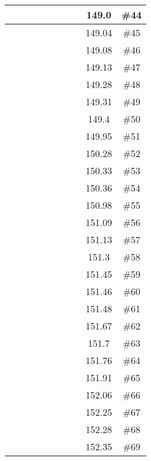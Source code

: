 \begin{center}
\begin{longtable}{|c|c|c|c|c|c|c|c|c|c|}
 \x &  \x &  \x &  \x &  &  &  &  & 149.0 & \#44 \\ \hline
 \x &  \x &  &  &  \x &  &  &  \x & 149.04 & \#45 \\ \hline
 \x &  &  &  \x &  &  \x &  &  & 149.08 & \#46 \\ \hline
 \x &  &  \x &  &  &  \x &  \x &  & 149.13 & \#47 \\ \hline
 \x &  \x &  \x &  &  &  \x &  \x &  \x & 149.28 & \#48 \\ \hline
 \x &  \x &  &  \x &  \x &  \x &  &  & 149.31 & \#49 \\ \hline
 \x &  &  \x &  &  \x &  &  &  \x & 149.4 & \#50 \\ \hline
 \x &  \x &  \x &  &  &  \x &  &  \x & 149.95 & \#51 \\ \hline
 \x &  &  \x &  &  \x &  \x &  \x &  & 150.28 & \#52 \\ \hline
 \x &  \x &  \x &  \x &  &  \x &  &  \x & 150.33 & \#53 \\ \hline
 \x &  \x &  &  &  &  \x &  \x &  \x & 150.36 & \#54 \\ \hline
 \x &  \x &  &  &  &  \x &  &  \x & 150.98 & \#55 \\ \hline
 \x &  &  &  &  \x &  &  &  \x & 151.09 & \#56 \\ \hline
 \x &  &  \x &  \x &  &  &  &  & 151.13 & \#57 \\ \hline
 \x &  &  &  \x &  &  &  &  \x & 151.3 & \#58 \\ \hline
 \x &  \x &  &  \x &  &  \x &  &  \x & 151.45 & \#59 \\ \hline
 \x &  \x &  \x &  \x &  \x &  \x &  &  & 151.46 & \#60 \\ \hline
 \x &  \x &  &  &  \x &  \x &  \x &  \x & 151.48 & \#61 \\ \hline
 \x &  \x &  &  \x &  \x &  \x &  \x &  \x & 151.67 & \#62 \\ \hline
 \x &  &  \x &  \x &  &  &  &  \x & 151.7 & \#63 \\ \hline
 \x &  &  \x &  \x &  \x &  \x &  \x &  \x & 151.76 & \#64 \\ \hline
 \x &  &  \x &  \x &  \x &  \x &  &  \x & 151.91 & \#65 \\ \hline
 \x &  &  \x &  \x &  &  \x &  \x &  \x & 152.06 & \#66 \\ \hline
 \x &  \x &  &  &  \x &  &  &  & 152.25 & \#67 \\ \hline
 \x &  &  &  &  \x &  \x &  &  \x & 152.28 & \#68 \\ \hline
 \x &  \x &  &  \x &  &  &  &  \x & 152.35 & \#69 \\ \hline

\end{longtable}
\end{center}
